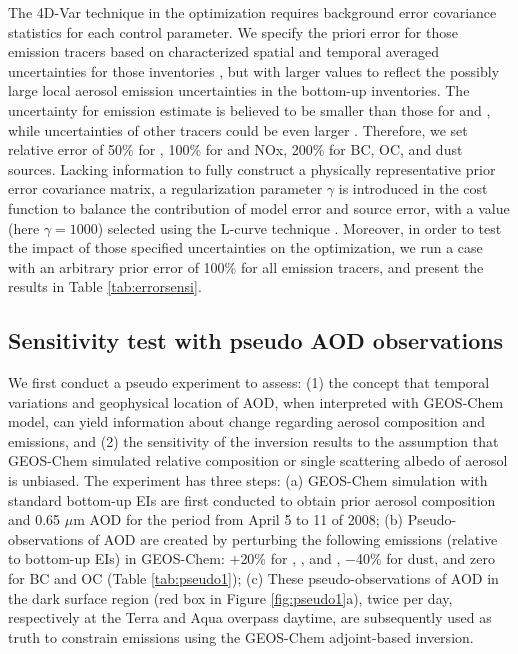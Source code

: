  The 4D-Var technique in the optimization requires background 
 error covariance statistics for each control parameter. 
 We specify the priori error for those emission tracers 
 based on characterized spatial and temporal averaged uncertainties for those inventories 
 \citep{Zhang09b,Bond07,Zender03a},
 but with larger values to reflect the possibly large local aerosol emission 
 uncertainties in the bottom-up inventories. 
 The uncertainty for  emission estimate is believed 
 to be smaller than those for  and , 
 while uncertainties of other tracers could be even larger \citep{Textor06,Zhang09b}.
 Therefore, we set relative error of 50\% for , 100\% for  and NOx, 
 200\% for BC, OC, and dust sources. 
 Lacking information to fully construct a physically representative 
 prior error covariance matrix, a regularization parameter $\gamma$ 
 is introduced in the cost function to balance the contribution of model error
and source error,  with a value (here $\gamma = 1000$) selected using the 
L-curve technique \citep{Hansen98}. Moreover, in order to test the impact of 
those specified uncertainties on the optimization, 
 we run a case with an arbitrary prior error of 100\% for all emission tracers, 
 and present the results in Table \ref{tab:errorsensi}. 

 \subsection{Sensitivity test with pseudo AOD observations} \label{subsec:pseudo}

 We first conduct a pseudo experiment to assess: 
 (1) the concept that temporal variations and geophysical location of AOD, 
 when interpreted with GEOS-Chem model, 
 can yield information about change regarding aerosol composition and emissions, 
 and (2) the sensitivity of the inversion results to the assumption 
 that GEOS-Chem simulated relative composition or single scattering albedo of aerosol is unbiased.
 The experiment has three steps:
 (a) GEOS-Chem simulation with standard bottom-up EIs 
 are first conducted to obtain prior aerosol composition 
 and 0.65 $\mu$m AOD for the period from April 5 to 11 of 2008; 
 (b) Pseudo-observations of AOD are created by perturbing the following emissions 
 (relative to bottom-up EIs) in GEOS-Chem: $+$20\% for , , and , 
 $-$40\% for dust, and zero for BC and OC (Table \ref{tab:pseudo1}); 
 (c) These pseudo-observations of AOD in the dark surface region (red box in Figure \ref{fig:pseudo1}a), 
 twice per day, respectively at the Terra and Aqua overpass daytime, 
 are subsequently used as truth to constrain emissions using the GEOS-Chem adjoint-based inversion. 

